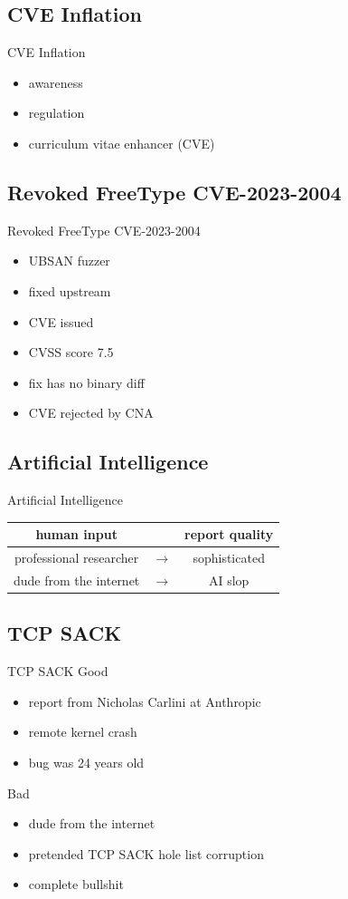 \documentclass[14pt,aspectratio=169]{beamer}
\begin{document}
\subsection{CVE Inflation}
\begin{frame}{CVE Inflation}
\begin{itemize}
\item awareness
\item regulation
\item curriculum vitae enhancer (CVE)
\end{itemize}
\end{frame}

\subsection{Revoked FreeType CVE-2023-2004}
\begin{frame}{Revoked FreeType CVE-2023-2004}
\begin{itemize}
\item UBSAN fuzzer
\item fixed upstream
\item CVE issued
\item CVSS score 7.5
\item fix has no binary diff
\item CVE rejected by CNA
\end{itemize}
\end{frame}

\subsection{Artificial Intelligence}
\begin{frame}{Artificial Intelligence}
\centering
\renewcommand{\arraystretch}{1.4}
\begin{tabular}{ccc}
human input		&		& report quality	\\
\hline
professional researcher & $\rightarrow$	& sophisticated		\\
dude from the internet	& $\rightarrow$	& AI slop		\\
\end{tabular}
\end{frame}

\subsection{TCP SACK}
\begin{frame}{TCP SACK}
Good
\begin{itemize}
\item report from Nicholas Carlini at Anthropic
\item remote kernel crash
\item bug was 24 years old
\end{itemize}
Bad
\begin{itemize}
\item dude from the internet
\item pretended TCP SACK hole list corruption
\item complete bullshit
\end{itemize}
\end{frame}
\end{document}
